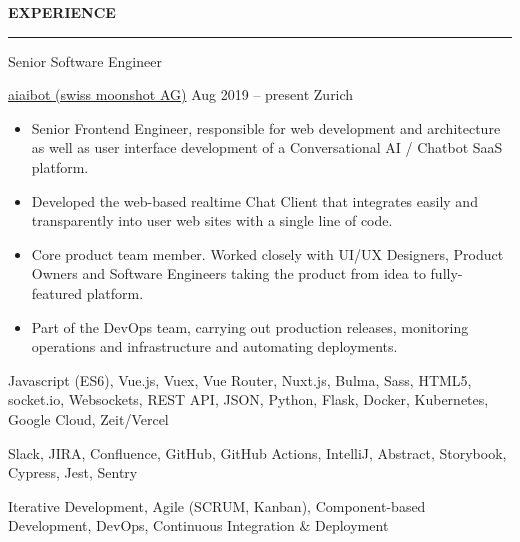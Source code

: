 \documentclass[11pt, a4paper, ragged2e, withhyper]{altacv}
\renewcommand{\cvsectionfont}{\Large\sffamily\bfseries}
\renewcommand{\cvevent}[4]{%
  {\Large\color{emphasis}#1\par}
  \medskip\normalsize
  \ifstrequal{#2}{}{}{
  	{#2}}
  \ifstrequal{#3}{}{}{{
  	\hspace{0.5em}
  	{#3}}}
  \ifstrequal{#4}{}{}{{
  	\hspace{0.5em}
  	{#4}}}\par
  \medskip\normalsize
}
\renewcommand{\cvsection}[2][]{%
  \bigskip%
  \ifstrequal{#1}{}{}{\marginpar{\vspace*{\dimexpr1pt-\baselineskip}\raggedright}}%
  {\color{heading}\cvsectionfont\MakeUppercase{#2}}\\%
  {\color{headingrule}\rule{\linewidth}{0.5pt}\par}\bigskip
}
\begin{document}
	
\pagestyle{default}
\makecvheader

\setlength{\columnsep}{30pt}

\begin{paracol}{2}


	\cvsection{Experience}
	
	\cvevent{Senior Software Engineer}{\href{https://www.aiaibot.com/}{aiaibot (swiss moonshot AG)}}{Aug 2019 -- present}{Zurich}

	\bigskip
	\begin{itemize}[label=\color{bullet}\textbullet]
		\item Senior Frontend Engineer, responsible for web development and architecture as well as user interface development of a Conversational AI / Chatbot SaaS platform.
		\item Developed the web-based realtime Chat Client that integrates easily and transparently into user web sites with a single line of code.
		\item Core product team member. Worked closely with UI/UX Designers, Product Owners and Software Engineers taking the product from idea to fully-featured platform.
		\item Part of the DevOps team, carrying out production releases, monitoring operations and infrastructure and automating deployments.
	\end{itemize}

	\bigskip
	\begin{description}
		\small
		\item [Technologies:] Javascript (ES6), Vue.js, Vuex, Vue Router, Nuxt.js, Bulma, Sass, HTML5, socket.io, Websockets, REST API, JSON, Python, Flask, Docker, Kubernetes, Google Cloud, Zeit/Vercel\smallskip
		\item [Tools:] Slack, JIRA, Confluence, GitHub, GitHub Actions, IntelliJ, Abstract, Storybook, Cypress, Jest, Sentry\smallskip
		\item [Methodologies:] Iterative Development, Agile (SCRUM, Kanban), Component-based Development, DevOps, Continuous Integration \& Deployment
	\end{description}


\end{paracol}
\end{document}
